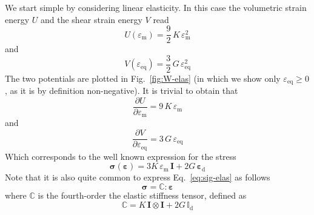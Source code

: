 \documentclass[times,namecite]{goose-article}
\begin{document}
We start simple by considering linear elasticity. In this case the volumetric strain energy $U$ and the shear strain energy $V$ read
\begin{equation}\label{eq:U}
  U ( \varepsilon_\mathrm{m}  ) = \frac{9}{2} \, K \, \varepsilon_\mathrm{m}^2
\end{equation}
and
\begin{equation}\label{eq:V-elas}
  V ( \varepsilon_\mathrm{eq} ) = \frac{3}{2} \, G \, \varepsilon_\mathrm{eq}^2
\end{equation}
The two potentials are plotted in Fig.~\ref{fig:W-elas} (in which we show only $\varepsilon_\mathrm{eq} \geq 0$, as it is by definition non-negative). It is trivial to obtain that
\begin{equation}
  \frac{\partial U}{\partial \varepsilon_\mathrm{m}}
  =
  9 \, K \, \varepsilon_\mathrm{m}
\end{equation}
and
\begin{equation}
  \frac{\partial V}{\partial \varepsilon_\mathrm{eq}}
  =
  3 \, G \, \varepsilon_\mathrm{eq}
\end{equation}
Which corresponds to the well known expression for the stress
\begin{equation}\label{eq:sig-elas}
  \bm{\sigma} ( \bm{\varepsilon} )
  =
  3 K \, \varepsilon_\mathrm{m} \, \bm{I}
  +
  2 G \, \bm{\varepsilon}_\mathrm{d}
\end{equation}
Note that it is also quite common to express Eq.~\eqref{eq:sig-elas} as follows
\begin{equation}
  \bm{\sigma} = \mathbb{C} : \bm{\varepsilon}
\end{equation}
where $\mathbb{C}$ is the fourth-order the elastic stiffness tensor, defined as
\begin{equation}
  \mathbb{C} = K \, \bm{I} \otimes \bm{I} + 2 G \, \mathbb{I}_\mathrm{d}
\end{equation}
\end{document}
